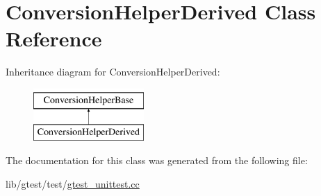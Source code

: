 \hypertarget{class_conversion_helper_derived}{\section{Conversion\-Helper\-Derived Class Reference}
\label{class_conversion_helper_derived}
}
Inheritance diagram for Conversion\-Helper\-Derived\-:\begin{figure}[H]
\begin{center}
\leavevmode
\includegraphics[height=2.000000cm]{class_conversion_helper_derived}
\end{center}
\end{figure}


The documentation for this class was generated from the following file\-:\begin{DoxyCompactItemize}
\item 
lib/gtest/test/\hyperlink{gtest__unittest_8cc}{gtest\-\_\-unittest.\-cc}\end{DoxyCompactItemize}
